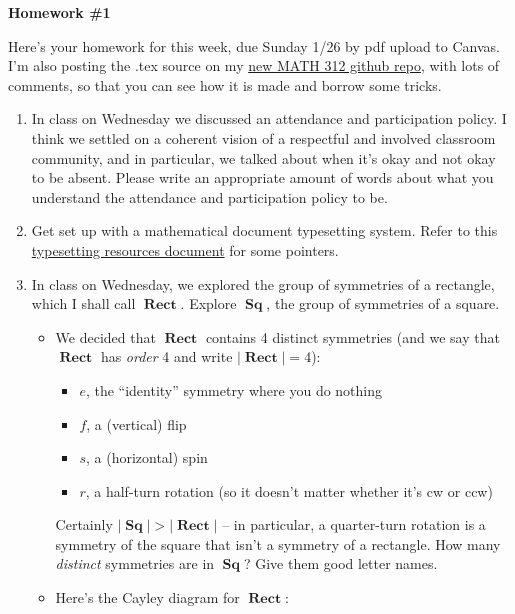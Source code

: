 \documentclass[12pt]{article}
\DeclareMathOperator\Rect{\mathbf{Rect}}
\DeclareMathOperator\Sq{\mathbf{Sq}}
\renewcommand{\section}[1]{\begin{center} \textbf{#1} \\\end{center}}
\begin{document}
\section{Homework \#1} %

Here's your homework for this week, due Sunday 1/26 by pdf upload to Canvas. I'm also posting the .tex source on my \href{https://github.com/rhinopotamus/math312}{new MATH 312 github repo}, with lots of comments, so that you can see how it is made and borrow some tricks.

\begin{enumerate} %
    \item In class on Wednesday we discussed an attendance and participation policy. I think we settled on a coherent vision of a respectful and involved classroom community, and in particular, we talked about when it's okay and not okay to be absent. Please write an appropriate amount of words about what you understand the attendance and participation policy to be.

    \item Get set up with a mathematical document typesetting system. Refer to this \href{https://github.com/rhinopotamus/math312/blob/main/resources/typesetting.md}{typesetting resources document} for some pointers.

    \item In class on Wednesday, we explored the group of symmetries of a rectangle, which I shall call $\Rect$. Explore $\Sq$, the group of symmetries of a square.
    \begin{itemize} %
        \item We decided that $\Rect$ contains 4 distinct symmetries (and we say that $\Rect$ has \textit{order} 4 and write $|\Rect| = 4$):
        \begin{itemize} %
            \item $e$, the ``identity'' symmetry where you do nothing
            \item \(f\), a (vertical) flip
            \item $s$, a (horizontal) spin
            \item $r$, a half-turn rotation (so it doesn't matter whether it's cw or ccw)
        \end{itemize}
        Certainly $|\Sq| > |\Rect|$ -- in particular, a quarter-turn rotation is a symmetry of the square that isn't a symmetry of a rectangle. How many \textit{distinct} symmetries are in $\Sq$? Give them good letter names.
        \item Here's the Cayley diagram for $\Rect$:


\end{itemize}
\end{enumerate}
\end{document}
